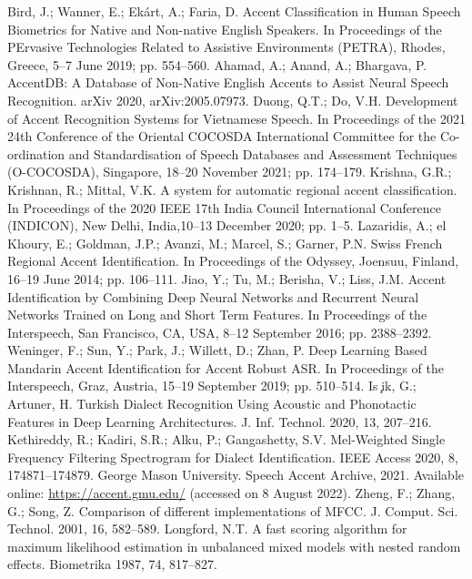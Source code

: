 \documentclass[ams]{U-AizuGT}
\begin{document}
\begin{thebibliography}{}
Bird, J.; Wanner, E.; Ekárt, A.; Faria, D. Accent Classification in Human Speech Biometrics for Native and Non-native English Speakers. In Proceedings of the PErvasive Technologies Related to Assistive Environments (PETRA), Rhodes, Greece, 5–7 June 2019; pp. 554–560. 
Ahamad, A.; Anand, A.; Bhargava, P. AccentDB: A Database of Non-Native English Accents to Assist Neural Speech Recognition. arXiv 2020, arXiv:2005.07973.
Duong, Q.T.; Do, V.H. Development of Accent Recognition Systems for Vietnamese Speech. In Proceedings of the 2021 24th Conference of the Oriental COCOSDA International Committee for the Co-ordination and Standardisation of Speech Databases and Assessment Techniques (O-COCOSDA), Singapore, 18–20 November 2021; pp. 174–179.
Krishna, G.R.; Krishnan, R.; Mittal, V.K. A system for automatic regional accent classification. In Proceedings of the 2020 IEEE 17th India Council International Conference (INDICON), New Delhi, India,10–13 December 2020; pp. 1–5.
Lazaridis, A.; el Khoury, E.; Goldman, J.P.; Avanzi, M.; Marcel, S.; Garner, P.N. Swiss French Regional Accent Identification. In Proceedings of the Odyssey, Joensuu, Finland, 16–19 June 2014; pp. 106–111.
Jiao, Y.; Tu, M.; Berisha, V.; Liss, J.M. Accent Identification by Combining Deep Neural Networks and Recurrent Neural Networks Trained on Long and Short Term Features. In Proceedings of the Interspeech, San Francisco, CA, USA, 8–12 September 2016; pp. 2388–2392.
Weninger, F.; Sun, Y.; Park, J.; Willett, D.; Zhan, P. Deep Learning Based Mandarin Accent Identification for Accent Robust ASR. In Proceedings of the Interspeech, Graz, Austria, 15–19 September 2019; pp. 510–514.
Is ̧ik, G.; Artuner, H. Turkish Dialect Recognition Using Acoustic and Phonotactic Features in Deep Learning Architectures. J. Inf. Technol. 2020, 13, 207–216.
Kethireddy, R.; Kadiri, S.R.; Alku, P.; Gangashetty, S.V. Mel-Weighted Single Frequency Filtering Spectrogram for Dialect Identification. IEEE Access 2020, 8, 174871–174879. 
George Mason University. Speech Accent Archive, 2021. Available online: \url{https://accent.gmu.edu/} (accessed on 8 August 2022).
Zheng, F.; Zhang, G.; Song, Z. Comparison of different implementations of MFCC. J. Comput. Sci. Technol. 2001, 16, 582–589.
Longford, N.T. A fast scoring algorithm for maximum likelihood estimation in unbalanced mixed models with nested random effects. Biometrika 1987, 74, 817–827.

\end{thebibliography}
\end{document}
